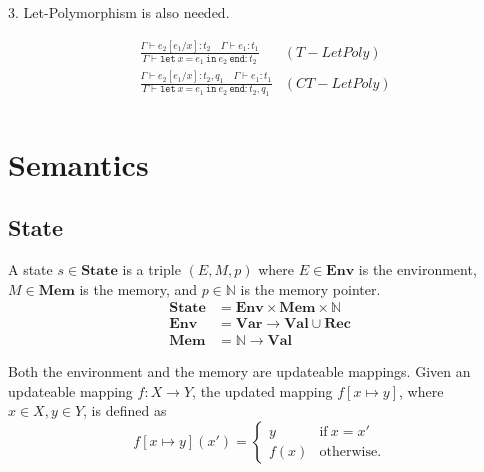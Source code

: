 \documentclass{article}
\begin{document}
3. Let-Polymorphism is also needed.

\begin{align*}
	&\frac{\Gamma \vdash e_2[e_1/x]:t_2 \quad \Gamma \vdash e_1:t_1}
	{\Gamma\vdash \texttt{let}\ x\ \texttt{=}\ e_1\ \texttt{in}\ e_2\ \texttt{end} : t_2} &(T-LetPoly)\\
	&\frac{\Gamma \vdash e_2[e_1/x]:t_2,q_1 \quad \Gamma \vdash e_1:t_1}
	{\Gamma\vdash \texttt{let}\ x\ \texttt{=}\ e_1\ \texttt{in}\ e_2\ \texttt{end} : t_2, q_1}&(CT-LetPoly)\\
\end{align*}

\section{Semantics}

\subsection{State}

A state $s\in\mathbf{State}$ is a triple $(E,M,p)$ where
$E\in\mathbf{Env}$ is the environment,
$M\in\mathbf{Mem}$ is the memory, and
$p\in\mathbb{N}$ is the memory pointer.
\begin{align*}
\mathbf{State} &= \mathbf{Env} \times \mathbf{Mem} \times \mathbb{N} \\
  \mathbf{Env} &= \mathbf{Var} \to \mathbf{Val}\cup\mathbf{Rec} \\
  \mathbf{Mem} &= \mathbb{N} \to \mathbf{Val}
\end{align*}

Both the environment and the memory are updateable mappings.
Given an updateable mapping $f:X\to Y$, the updated mapping $f[x\mapsto y]$,
where $x\in X, y\in Y$, is defined as \[f[x\mapsto y](x') = \begin{cases}
  y & \text{if}\ x=x' \\
  f(x) & \text{otherwise.}
\end{cases}\]
\end{document}
